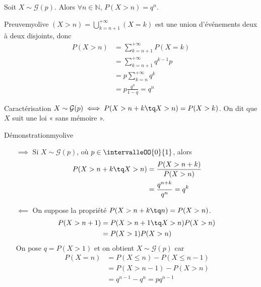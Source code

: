     \begin{prop}{}{}
        Soit $X \sim \mathcal{G}(p)$. Alors $\forall n \in \mathbb{N}$, $P(X > n) = q^n$.
    \end{prop}

    \begin{demo}{Preuve}{myolive}
        $(X > n) = \bigcup_{k = n+1}^{+\infty} (X = k)$ est une union d’événements deux à deux disjoints, donc 
        \begin{align*}
            P(X > n) &= \sum_{k=n+1}^{+\infty} P(X = k) \\
            &= \sum_{k=n+1}^{+\infty} q^{k-1} p \\
            &= p \sum_{k=n}^{+\infty} q^k \\
            &= p \frac{q^n}{1 - q} = q^n
        \end{align*}
    \end{demo}

    \begin{prop}{Caractérisation}{}
        $X \sim \mathcal{G}(p) \iff P(X > n + k \tq X > n) = P(X > k)$. On dit que $X$ suit une loi « sans mémoire ».
    \end{prop}

    \begin{demo}{Démonstration}{myolive}
        \begin{itemize}
            \item[$\implies$] Si $X \sim \mathcal{G}(p)$, où $p \in \intervalleOO{0}{1}$, alors 
            \begin{align*}
                P(X > n+k \tq X > n) &= \frac{P( X > n+k)}{P(X > n)} \\
                &= \frac{q^{n+k}}{q^n} = q^k
            \end{align*}
            \item[$\impliedby$] On suppose la propriété $P(X > n+k \tq n) = P(X > n)$. 
            \begin{align*}
                P(X > n+1) &= P(X > n+1 \tq X > n) P(X > n) \\
                &= P(X > 1) P(X > n) 
            \end{align*}
            On pose $q = P(X > 1)$ et on obtient $X \sim \mathcal{G}(p)$ car 
            \begin{align*}
                P(X = n) &= P(X \leq n) - P(X \leq n-1) \\
                &= P(X > n-1) - P(X > n) \\
                &= q^{n-1} - q^n = p q^{n-1}
            \end{align*}
        \end{itemize}
    \end{demo}

